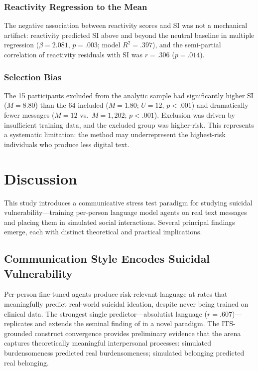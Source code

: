\documentclass[review,12pt,authoryear]{elsarticle}
\begin{document}
\subsubsection{Reactivity Regression to the Mean}

The negative association between reactivity scores and SI was not a mechanical artifact: reactivity predicted SI above and beyond the neutral baseline in multiple regression ($\beta = 2.081$, $p = .003$; model $R^2 = .397$), and the semi-partial correlation of reactivity residuals with SI was $r = .306$ ($p = .014$).

\subsubsection{Selection Bias}

The 15 participants excluded from the analytic sample had significantly higher SI ($M = 8.80$) than the 64 included ($M = 1.80$; $U = 12$, $p < .001$) and dramatically fewer messages ($M = 12$ vs.\ $M = 1{,}202$; $p < .001$). Exclusion was driven by insufficient training data, and the excluded group was higher-risk. This represents a systematic limitation: the method may underrepresent the highest-risk individuals who produce less digital text.


\section{Discussion}

This study introduces a communicative stress test paradigm for studying suicidal vulnerability---training per-person language model agents on real text messages and placing them in simulated social interactions. Several principal findings emerge, each with distinct theoretical and practical implications.

\subsection{Communication Style Encodes Suicidal Vulnerability}

Per-person fine-tuned agents produce risk-relevant language at rates that meaningfully predict real-world suicidal ideation, despite never being trained on clinical data. The strongest single predictor---absolutist language ($r = .607$)---replicates and extends the seminal finding of \citet{almosaiwi2018absolute} in a novel paradigm. The ITS-grounded construct convergence provides preliminary evidence that the arena captures theoretically meaningful interpersonal processes: simulated burdensomeness predicted real burdensomeness; simulated belonging predicted real belonging.
\end{document}
